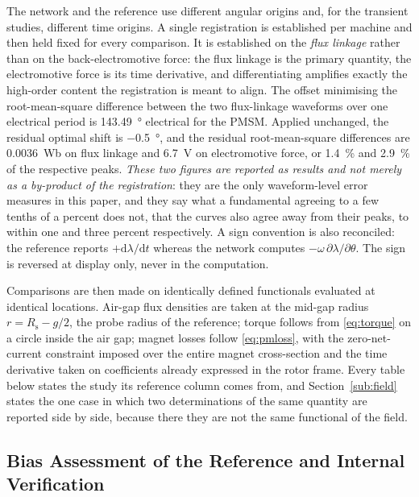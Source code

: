 \documentclass[10pt,a4paper,twocolumn]{article}
\newcommand{\Rs}{R_{\mathrm{s}}}
\theoremstyle{plain}
\theoremstyle{remark}
\begin{document}
The network and the reference use different angular origins and, for the
transient studies, different time origins. A single registration is
established per machine and then held fixed for every comparison. It is
established on the \emph{flux linkage} rather than on the
back-electromotive force: the flux linkage is the primary quantity, the
electromotive force is its time derivative, and differentiating
amplifies exactly the high-order content the registration is meant to
align. The offset minimising the root-mean-square difference between the
two flux-linkage waveforms over one electrical period is
\SI{143.49}{\degree} electrical for the PMSM. Applied unchanged, the
residual optimal shift is \SI{-0.5}{\degree}, and the residual
root-mean-square differences are \SI{0.0036}{\weber} on flux linkage and
\SI{6.7}{\volt} on electromotive force, or \SI{1.4}{\percent} and
\SI{2.9}{\percent} of the respective peaks. \emph{These two figures are
reported as results and not merely as a by-product of the registration}:
they are the only waveform-level error measures in this paper, and they
say what a fundamental agreeing to a few tenths of a percent does not, that the curves also agree away from their peaks, to within one and
three percent respectively. A sign convention is also
reconciled: the reference reports $+\mathrm{d}\lambda/\mathrm{d}t$
whereas the network computes $-\omega\,\partial\lambda/\partial\theta$.
The sign is reversed at display only, never in the computation.

Comparisons are then made on identically defined functionals evaluated
at identical locations. Air-gap flux densities are taken at the mid-gap
radius $r = \Rs - g/2$, the probe radius of the reference; torque
follows from \eqref{eq:torque} on a circle inside the air gap; magnet
losses follow \eqref{eq:pmloss}, with the zero-net-current constraint
imposed over the entire magnet cross-section and the time derivative
taken on coefficients already expressed in the rotor frame. Every table
below states the study its reference column comes from, and
Section~\ref{sub:field} states the one case in which two determinations
of the same quantity are reported side by side, because there they are
not the same functional of the field.

\subsection{Bias Assessment of the Reference and Internal Verification}
\label{sub:posture}
\end{document}
